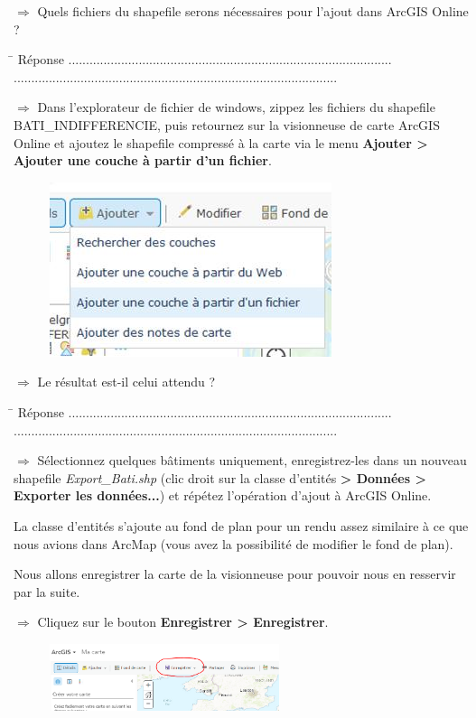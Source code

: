 \documentclass[11pt]{article}
\newcommand{\action}{$\Rightarrow$ }
\newcommand{\reponse}{
	\begin{tabbing}
	\hspace{2cm}\=\kill
	Réponse \> ............................................................................................ \\ 
 	\> ............................................................................................
	\end{tabbing}
}
\begin{document}
\action Quels fichiers du shapefile serons nécessaires pour l'ajout dans ArcGIS Online ?

\reponse

\action Dans l'explorateur de fichier de windows, zippez les fichiers du shapefile BATI\_INDIFFERENCIE, puis retournez sur la visionneuse de carte ArcGIS Online et ajoutez le shapefile compressé à la carte via le menu \textbf{Ajouter > Ajouter une couche à partir d'un fichier}.
\begin{figure}[H]
	\center \includegraphics{img/td1/ago_ajout_couche.jpg} \\
\end{figure}

\action Le résultat est-il celui attendu ?

\reponse

\action Sélectionnez quelques bâtiments uniquement, enregistrez-les dans un nouveau shapefile \textit{Export\_Bati.shp} (clic droit sur la classe d'entités \textbf{> Données > Exporter les données...}) et répétez l'opération d'ajout à ArcGIS Online.

La classe d'entités s'ajoute au fond de plan pour un rendu assez similaire à ce que nous avions dans ArcMap (vous avez la possibilité de modifier le fond de plan). 

Nous allons enregistrer la carte de la visionneuse pour pouvoir nous en resservir par la suite.

\action Cliquez sur le bouton \textbf{Enregistrer > Enregistrer}. 
\begin{figure}[H]
	\center \includegraphics[width=0.6\textwidth]{img/td1/ago_enregistrer_carte.png} \\
\end{figure}
\end{document}
